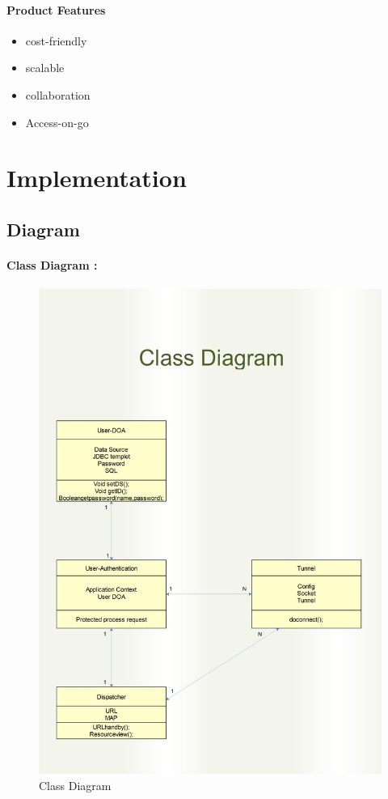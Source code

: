 \documentclass[12pt,a4paper,final,oneside]{report}
\begin{document}
\subsubsection{Product Features}
\begin{itemize}
\item cost-friendly
\item scalable 
\item collaboration
\item Access-on-go
\end{itemize}
\newpage
\chapter{Implementation}
\section{Diagram}
\subsubsection{Class Diagram :}
\begin{figure}
\centering
\includegraphics[totalheight=0.98\textheight,angle=0]		{Class.jpg}
		\caption{Class Diagram}
		\newpage
\end{figure}
\end{document}
